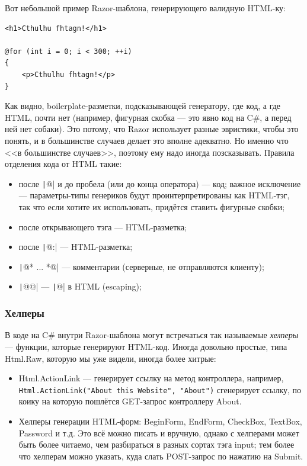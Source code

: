 \documentclass[a5paper]{article}
\begin{document}
Вот небольшой пример Razor-шаблона, генерирующего валидную HTML-ку:

\begin{verbatim}
<h1>Cthulhu fhtagn!</h1>

@for (int i = 0; i < 300; ++i)
{
    <p>Cthulhu fhtagn!</p>
}
\end{verbatim}

Как видно, boilerplate-разметки, подсказывающей генератору, где код, а где HTML, почти нет (например, фигурная скобка --- это явно код на C\#, а перед ней нет собаки). Это потому, что Razor использует разные эвристики, чтобы это понять, и в большинстве случаев делает это вполне адекватно. Но именно что <<в большинстве случаев>>, поэтому ему надо иногда позсказывать. Правила отделения кода от HTML такие:

\begin{itemize}
    \item после \texttt|@| и до пробела (или до конца оператора) --- код; важное исключение --- параметры-типы генериков будут проинтерпретированы как HTML-тэг, так что если хотите их использовать, придётся ставить фигурные скобки;
    \item после открывающего тэга --- HTML-разметка;
    \item после \texttt|@:| --- HTML-разметка;
    \item \texttt|@* ... *@| --- комментарии (серверные, не отправляются клиенту);
    \item \texttt|@@| --- \texttt|@| в HTML (escaping);
\end{itemize}

\subsubsection{Хелперы}

В коде на C\# внутри Razor-шаблона могут встречаться так называемые \emph{хелперы} --- функции, которые генерируют HTML-код. Иногда довольно простые, типа Html.Raw, которую мы уже видели, иногда более хитрые:

\begin{itemize}
    \item Html.ActionLink --- генерирует ссылку на метод контроллера, например, \texttt{Html.ActionLink("About this Website", "About")} сгенерирует ссылку, по коику на которую пошлётся GET-запрос контроллеру About.
    \item Хелперы генерации HTML-форм: BeginForm, EndForm, CheckBox, TextBox, Password и т.д. Это всё можно писать и вручную, однако с хелперами может быть более читаемо, чем разбираться в разных сортах тэга input; тем более что хелперам можно указать, куда слать POST-запрос по нажатию на Submit.
\end{itemize}
\end{document}
